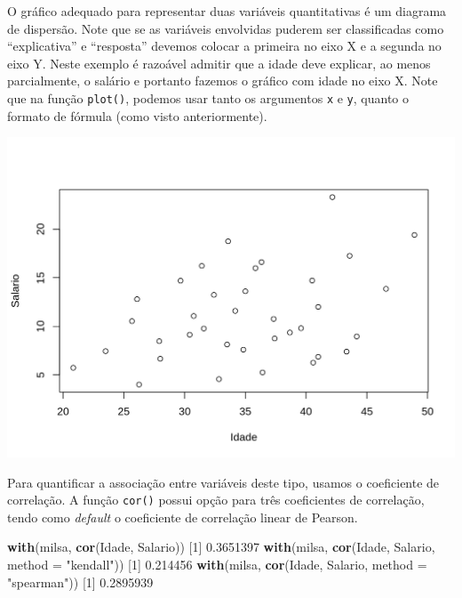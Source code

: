 \documentclass[10pt,a4paper]{book}
\newenvironment{Shaded}{\begin{snugshade}}{\end{snugshade}}
\newcommand{\KeywordTok}[1]{\textcolor[rgb]{0.13,0.29,0.53}{\textbf{#1}}}
\newcommand{\DataTypeTok}[1]{\textcolor[rgb]{0.13,0.29,0.53}{#1}}
\newcommand{\DecValTok}[1]{\textcolor[rgb]{0.00,0.00,0.81}{#1}}
\newcommand{\FloatTok}[1]{\textcolor[rgb]{0.00,0.00,0.81}{#1}}
\newcommand{\StringTok}[1]{\textcolor[rgb]{0.31,0.60,0.02}{#1}}
\newcommand{\OperatorTok}[1]{\textcolor[rgb]{0.81,0.36,0.00}{\textbf{#1}}}
\newcommand{\NormalTok}[1]{#1}
\begin{document}
O gráfico adequado para representar duas variáveis quantitativas é um
diagrama de dispersão. Note que se as variáveis envolvidas puderem ser
classificadas como ``explicativa'' e ``resposta'' devemos colocar a
primeira no eixo X e a segunda no eixo Y. Neste exemplo é razoável
admitir que a idade deve explicar, ao menos parcialmente, o salário e
portanto fazemos o gráfico com idade no eixo X. Note que na função
\texttt{plot()}, podemos usar tanto os argumentos \texttt{x} e
\texttt{y}, quanto o formato de fórmula (como visto anteriormente).

\begin{Shaded}
\end{Shaded}

\begin{center}\includegraphics{figures/unnamed-chunk-323-1} \end{center}

Para quantificar a associação entre variáveis deste tipo, usamos o
coeficiente de correlação. A função \texttt{cor()} possui opção para
três coeficientes de correlação, tendo como \emph{default} o coeficiente
de correlação linear de Pearson.

\begin{Shaded}
\begin{Highlighting}[]
\KeywordTok{with}\NormalTok{(milsa, }\KeywordTok{cor}\NormalTok{(Idade, Salario))}
\NormalTok{[}\DecValTok{1}\NormalTok{] }\FloatTok{0.3651397}
\KeywordTok{with}\NormalTok{(milsa, }\KeywordTok{cor}\NormalTok{(Idade, Salario, }\DataTypeTok{method =} \StringTok{"kendall"}\NormalTok{))}
\NormalTok{[}\DecValTok{1}\NormalTok{] }\FloatTok{0.214456}
\KeywordTok{with}\NormalTok{(milsa, }\KeywordTok{cor}\NormalTok{(Idade, Salario, }\DataTypeTok{method =} \StringTok{"spearman"}\NormalTok{))}
\NormalTok{[}\DecValTok{1}\NormalTok{] }\FloatTok{0.2895939}
\end{Highlighting}
\end{Shaded}
\end{document}
